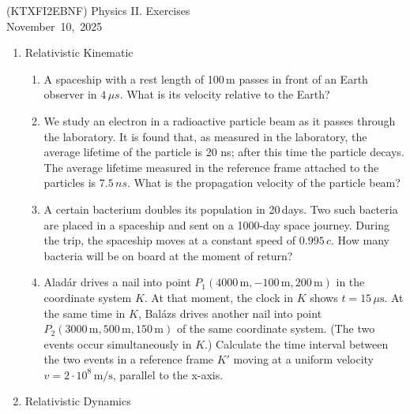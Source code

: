 \documentclass[a4paper,12pt]{letter}
\begin{document}
\begin{center}
 (KTXFI2EBNF) Physics II.  Exercises \\ \smallskip
November~10,~2025
 \end{center}

\begin{enumerate}[label=\Roman*.]

\item Relativistic Kinematic
 
\begin{enumerate}[label=\arabic*.] 

\item A spaceship with a rest length of 100\,m passes in front of an Earth observer in $4\,\mu s$.  What is its velocity relative to the Earth?

\item We study an electron in a radioactive particle beam as it passes through the laboratory.  It is found that, as measured in the laboratory, the average lifetime of the particle is 20 ns; after this time the particle decays.  The average lifetime measured in the reference frame attached to the particles is $7.5\,ns$.  What is the propagation velocity of the particle beam?

\item A certain bacterium doubles its population in 20\,days.  Two such bacteria are placed in a spaceship and sent on a 1000-day space journey.  During the trip, the spaceship moves at a constant speed of $0.995 \, c$. How many bacteria will be on board at the moment of return?

\item Aladár drives a nail into point $ P_1(4000\,\text{m}, -100\,\text{m}, 200\,\text{m}) $ in the coordinate system $ K $.  At that moment, the clock in $ K $ shows $ t = 15 \, \mu\text{s} $.  At the same time in $ K $, Balázs drives another nail into point $ P_2(3000\,\text{m}, 500\,\text{m}, 150\,\text{m}) $ of the same coordinate system.  (The two events occur simultaneously in $ K $.)  Calculate the time interval between the two events in a reference frame $ K' $ moving at a uniform velocity $ v = 2 \cdot 10^8 \, \text{m/s} $, parallel to the x-axis.

\end{enumerate}

\item Relativistic Dynamics

\begin{enumerate}[label=\arabic*.] 


\end{enumerate}
\end{enumerate}
\end{document}
